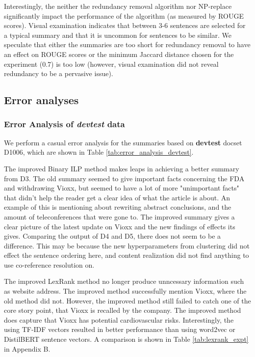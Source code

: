 

Interestingly, the neither the redundancy removal algorithm nor NP-replace significantly impact the performance of the algorithm (as measured by ROUGE scores). Visual examination indicates that between 3-6 sentences are selected for a typical summary and that it is uncommon for sentences to be similar. We speculate that either the summaries are too short for redundancy removal to have an effect on ROUGE scores or the minimum Jaccard distance chosen for the experiment (0.7) is too low (however, visual examination did not reveal redundancy to be a pervasive issue).

\subsection{Error analyses}

\subsubsection{Error Analysis of \textit{devtest} data}

We perform a casual error analysis for the summaries based on \textbf{devtest} docset D1006, which are shown in Table \ref{tab:error_analysis_devtest}.

The improved Binary ILP method makes leaps in achieving a better summary from D3. The old summary seemed to give important facts concerning the FDA and withdrawing Vioxx, but seemed to have a lot of more "unimportant facts" that didn't help the reader get a clear idea of what the article is about. An example of this is mentioning about rewriting abstract conclusions, and the amount of teleconferences that were gone to. The improved summary gives a clear picture of the latest update on Vioxx and the new findings of effects its gives. Comparing the output of D4 and D5, there does not seem to be a difference. This may be because the new hyperparameters from clustering did not effect the sentence ordering here, and content realization did not find anything to use co-reference resolution on.

The improved LexRank method no longer produce unncessary information such as website address. The improved method successfully mention Vioxx, where the old method did not. However, the improved method still failed to catch one of the core story point, that Vioxx is recalled by the company. The improved method does capture that Vioxx has potential cardiovascular risks. Interestingly, the using TF-IDF vectors resulted in better performance than using word2vec or DistilBERT sentence vectors. A comparison is shown in Table \ref{tab:lexrank_expt} in Appendix B.

